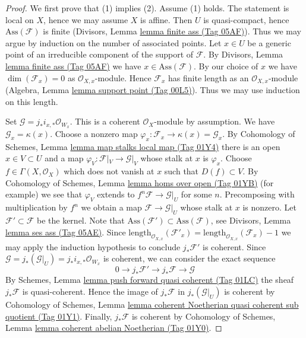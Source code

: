 \documentclass{amsart}
\theoremstyle{plain}
\theoremstyle{definition}
\theoremstyle{remark}
\numberwithin{equation}{subsection}
\begin{document}
\begin{proof}
We first prove that (1) implies (2). Assume (1) holds.
The statement is local on $X$, hence we may assume $X$ is affine.
Then $U$ is quasi-compact, hence $\text{Ass}(\mathcal{F})$ is finite
(Divisors, Lemma \href{https://stacks.math.columbia.edu/tag/05AF}{lemma finite ass (Tag 05AF)}). Thus we may argue by
induction on the number of associated points. Let $x \in U$ be a generic
point of an irreducible component of the support of $\mathcal{F}$.
By Divisors, Lemma \href{https://stacks.math.columbia.edu/tag/05AF}{lemma finite ass (Tag 05AF)} we have
$x \in \text{Ass}(\mathcal{F})$. By our choice of $x$ we have
$\dim(\mathcal{F}_x) = 0$ as $\mathcal{O}_{X, x}$-module.
Hence $\mathcal{F}_x$ has finite length as an $\mathcal{O}_{X, x}$-module
(Algebra, Lemma \href{https://stacks.math.columbia.edu/tag/00L5}{lemma support point (Tag 00L5)}).
Thus we may use induction on this length.

\medskip\noindent
Set $\mathcal{G} = j_*i_{x, *}\mathcal{O}_{W_x}$. This is a coherent
$\mathcal{O}_X$-module by assumption. We have $\mathcal{G}_x = \kappa(x)$.
Choose a nonzero map
$\varphi_x : \mathcal{F}_x \to \kappa(x) = \mathcal{G}_x$.
By Cohomology of Schemes, Lemma \href{https://stacks.math.columbia.edu/tag/01Y4}{lemma map stalks local map (Tag 01Y4)}
there is an open $x \in V \subset U$ and a map
$\varphi_V : \mathcal{F}|_V \to \mathcal{G}|_V$ whose stalk
at $x$ is $\varphi_x$. Choose $f \in \Gamma(X, \mathcal{O}_X)$
which does not vanish at $x$ such that $D(f) \subset V$. By
Cohomology of Schemes, Lemma \href{https://stacks.math.columbia.edu/tag/01YB}{lemma homs over open (Tag 01YB)}
(for example) we see that $\varphi_V$ extends to
$f^n\mathcal{F} \to \mathcal{G}|_U$ for some $n$.
Precomposing with multiplication by $f^n$ we obtain a map
$\mathcal{F} \to \mathcal{G}|_U$ whose stalk at $x$ is nonzero.
Let $\mathcal{F}' \subset \mathcal{F}$ be the kernel.
Note that $\text{Ass}(\mathcal{F}') \subset \text{Ass}(\mathcal{F})$, see
Divisors, Lemma \href{https://stacks.math.columbia.edu/tag/05AE}{lemma ses ass (Tag 05AE)}.
Since
$\text{length}_{\mathcal{O}_{X, x}}(\mathcal{F}'_x) =
\text{length}_{\mathcal{O}_{X, x}}(\mathcal{F}_x) - 1$
we may apply the
induction hypothesis to conclude $j_*\mathcal{F}'$ is coherent.
Since $\mathcal{G} = j_*(\mathcal{G}|_U) = j_*i_{x, *}\mathcal{O}_{W_x}$
is coherent, we can consider the exact sequence
$$
0 \to j_*\mathcal{F}' \to j_*\mathcal{F} \to \mathcal{G}
$$
By Schemes, Lemma \href{https://stacks.math.columbia.edu/tag/01LC}{lemma push forward quasi coherent (Tag 01LC)}
the sheaf $j_*\mathcal{F}$ is quasi-coherent.
Hence the image of $j_*\mathcal{F}$ in $j_*(\mathcal{G}|_U)$
is coherent by Cohomology of Schemes, Lemma
\href{https://stacks.math.columbia.edu/tag/01Y1}{lemma coherent Noetherian quasi coherent sub quotient (Tag 01Y1)}.
Finally, $j_*\mathcal{F}$ is coherent by
Cohomology of Schemes, Lemma \href{https://stacks.math.columbia.edu/tag/01Y0}{lemma coherent abelian Noetherian (Tag 01Y0)}.


\end{proof}
\end{document}
